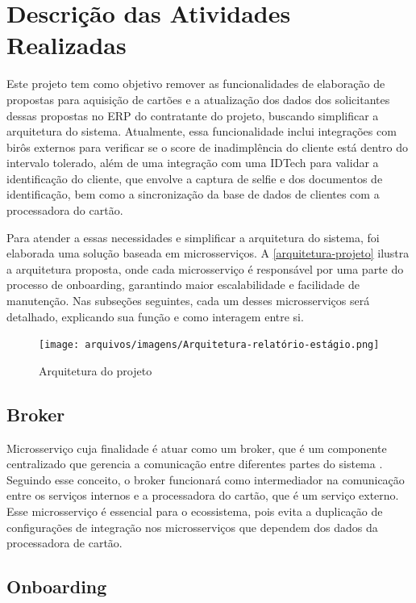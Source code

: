 \chapter{Descrição das Atividades Realizadas}
\label{cap:atividades}

Este projeto tem como objetivo remover as funcionalidades de elaboração de propostas para 
aquisição de cartões e a atualização dos dados dos solicitantes dessas propostas no ERP
do contratante do projeto, buscando simplificar a arquitetura do sistema. 
Atualmente, essa funcionalidade inclui integrações com birôs externos para 
verificar se o score de inadimplência do cliente está dentro do intervalo tolerado, 
além de uma integração com uma IDTech para validar a identificação do cliente, 
que envolve a captura de selfie e dos documentos 
de identificação, bem como a sincronização da base de dados  de clientes com a 
processadora do cartão.

Para atender a essas necessidades e simplificar a arquitetura do sistema, 
foi elaborada uma solução baseada em microsserviços. 
A \autoref{arquitetura-projeto} ilustra a arquitetura proposta, 
onde cada microsserviço é responsável por uma parte do processo de onboarding, 
garantindo maior escalabilidade e facilidade de manutenção. Nas subseções seguintes, 
cada um desses microsserviços será detalhado, explicando sua 
função e como interagem entre si.


\begin{figure} [!h]
    \centering
    \caption{Arquitetura do projeto}
    \texttt{[image: arquivos/imagens/Arquitetura-relatório-estágio.png]}
    \label{arquitetura-projeto}
\end{figure}

\section{Broker}

Microsserviço cuja finalidade é atuar como um broker, que é um  
componente centralizado que gerencia a comunicação entre diferentes partes do sistema \cite{distributed:systems:book}. 
Seguindo esse conceito, o broker funcionará como intermediador na comunicação entre os 
serviços internos e a processadora do cartão, que é um serviço externo. 
Esse microsserviço é essencial para o ecossistema, pois evita a duplicação de 
configurações de integração nos microsserviços que dependem dos dados da processadora 
de cartão.

\section{Onboarding}

